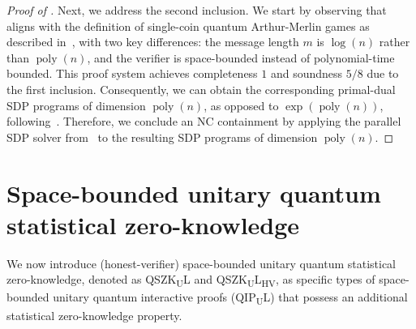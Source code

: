 \documentclass[10pt,a4paper]{article}
\numberwithin{equation}{section}
\numberwithin{figure}{section}
\newcommand{\QIPUL}{\texorpdfstring{\textnormal{\textsf{QIP}\textsubscript{\textnormal{U}}\textsf{L}}}\xspace}
\newcommand{\QSZKUL}{\texorpdfstring{\textnormal{\textsf{QSZK}\textsubscript{\textnormal{U}}\textsf{L}}}\xspace}
\newcommand{\QSZKULHV}{\texorpdfstring{\textnormal{\textsf{QSZK}\textsubscript{\textnormal{U}}\textsf{L}}\textsubscript{\textnormal{HV}}}\xspace}
\newcommand{\NC}{\textnormal{\textsf{NC}}\xspace}
\DeclareMathOperator\poly{poly}
\begin{document}
\begin{proof}[Proof of ]
    Next, we address the second inclusion. We start by observing that  aligns with the definition of single-coin quantum Arthur-Merlin games as described in~\cite[Section 2.4]{JJUW11}, with two key differences: the message length $m$ is $\log(n)$ rather than $\poly(n)$, and the verifier is space-bounded instead of polynomial-time bounded. This proof system achieves completeness $1$ and soundness $5/8$ due to the first inclusion. Consequently, we can obtain the corresponding primal-dual SDP programs of dimension $\poly(n)$, as opposed to $\exp(\poly(n))$, following~\cite[Section 2.5]{JJUW11}. Therefore, we conclude an \NC{} containment by applying the parallel SDP solver from~\cite{JJUW11} to the resulting SDP programs of dimension $\poly(n)$. 
\end{proof}

\section{Space-bounded unitary quantum statistical zero-knowledge}

We now introduce (honest-verifier) space-bounded unitary quantum statistical zero-knowledge, denoted as \QSZKUL{} and \QSZKULHV{}, as specific types of space-bounded unitary quantum interactive proofs (\QIPUL{}) that possess an additional statistical zero-knowledge property.
\end{document}
